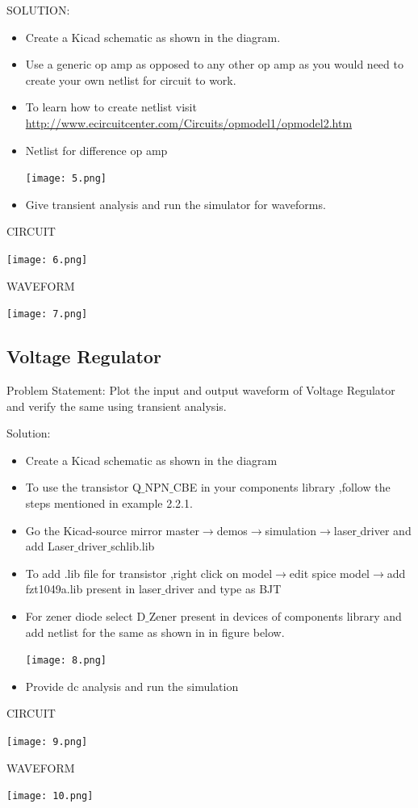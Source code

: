 \documentclass[12pt,a4paper]{  report}
\begin{document}
SOLUTION:
\begin{itemize}
\item Create a Kicad schematic as shown in the diagram.
\item Use a generic op amp as opposed to any other op amp as you would need to create your own netlist for circuit to work.
\item To learn how to create netlist visit \url{ http://www.ecircuitcenter.com/Circuits/opmodel1/opmodel2.htm}
\item Netlist for difference op amp
\begin{flushleft}
\texttt{[image: 5.png]}
\end{flushleft}
\item Give transient analysis and run the simulator for waveforms.
\end{itemize}
\newpage
CIRCUIT
\begin{flushleft}
\texttt{[image: 6.png]}
\end{flushleft}
WAVEFORM
\begin{flushleft}
\texttt{[image: 7.png]}
\end{flushleft}
\subsection{Voltage Regulator}
Problem Statement:
Plot the input and output waveform of Voltage Regulator and verify the same using transient analysis.

Solution:
\begin{itemize}
\item Create a Kicad schematic as shown in the diagram
\item To use the transistor Q$\_$NPN$\_$CBE  in your components library ,follow the steps mentioned in example 2.2.1.
\item  Go the Kicad-source mirror master$\rightarrow$demos$\rightarrow$simulation$\rightarrow$laser$\_$driver and add  Laser$\_$driver$\_$schlib.lib
\item To add .lib file for transistor ,right click on model$\rightarrow$edit spice model$\rightarrow$add fzt1049a.lib present in laser$\_$driver and type as BJT
\item For zener diode select D$\_$Zener present in devices of components library and add netlist for the same as shown in in figure below.
\begin{flushleft}
\texttt{[image: 8.png]}
\end{flushleft}
\item Provide dc analysis and run the simulation
\end{itemize}
CIRCUIT
\begin{flushleft}
\texttt{[image: 9.png]}
\end{flushleft}
WAVEFORM
\begin{flushleft}
\texttt{[image: 10.png]}
\end{flushleft}
\end{document}
